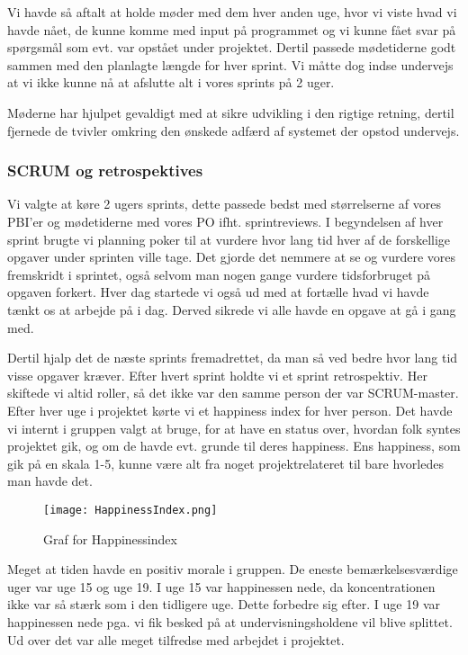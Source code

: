 Vi havde så aftalt at holde møder med dem hver anden uge, hvor vi viste hvad vi havde nået, de kunne komme med input på programmet og vi kunne fået svar på spørgsmål som evt. var opstået under projektet. Dertil passede mødetiderne godt sammen med den planlagte længde for hver sprint. 
Vi måtte dog indse undervejs at vi ikke kunne nå at afslutte alt i vores sprints på 2 uger.

Møderne har hjulpet gevaldigt med at sikre udvikling i den rigtige retning, dertil fjernede de tvivler omkring den ønskede adfærd af systemet der opstod undervejs. 

\subsubsection{SCRUM og retrospektives}

Vi valgte at køre 2 ugers sprints, dette passede bedst med størrelserne af vores PBI'er og mødetiderne med vores PO ifht. sprintreviews.
I begyndelsen af hver sprint brugte vi planning poker til at vurdere hvor lang tid hver af de forskellige opgaver under sprinten ville tage.
Det gjorde det nemmere at se og vurdere vores fremskridt i sprintet, også selvom man nogen gange vurdere tidsforbruget på opgaven forkert.
Hver dag startede vi også ud med at fortælle hvad vi havde tænkt os at arbejde på i dag. Derved sikrede vi alle havde en opgave at gå i gang med.

Dertil hjalp det de næste sprints fremadrettet, da man så ved bedre hvor lang tid visse opgaver kræver.
Efter hvert sprint holdte vi et sprint retrospektiv. Her skiftede vi altid roller, så det ikke var den samme person der var SCRUM-master.
Efter hver uge i projektet kørte vi et happiness index for hver person.
Det havde vi internt i gruppen valgt at bruge, for at have en status over, hvordan folk syntes projektet gik, og om de havde evt. grunde til deres happiness.
Ens happiness, som gik på en skala 1-5, kunne være alt fra noget projektrelateret til bare hvorledes man havde det.

\begin{figure}[h]
    \caption{Graf for Happinessindex}
    \centering
        \texttt{[image: HappinessIndex.png]}
    \label{happinessindex}
\end{figure}

Meget at tiden havde en positiv morale i gruppen. De eneste bemærkelsesværdige uger var uge 15 og uge 19.
I uge 15 var happinessen nede, da koncentrationen ikke var så stærk som i den tidligere uge. Dette forbedre sig efter.
I uge 19 var happinessen nede pga. vi fik besked på at undervisningsholdene vil blive splittet. Ud over det var alle meget tilfredse med arbejdet i projektet.


